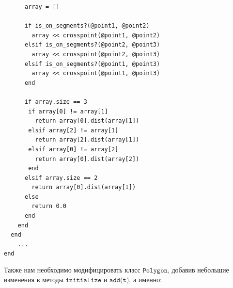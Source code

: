 \begin{small}
\begin{verbatim}
      array = []
	  
	  if is_on_segments?(@point1, @point2)
	    array << crosspoint(@point1, @point2) 
      elsif is_on_segments?(@point2, @point3)
	    array << crosspoint(@point2, @point3) 
      elsif is_on_segments?(@point1, @point3)
	    array << crosspoint(@point1, @point3) 
	  end
	  
      if array.size == 3 
       if array[0] != array[1]
	     return array[0].dist(array[1]) 
       elsif array[2] != array[1]
	     return array[2].dist(array[1]) 
       elsif array[0] != array[2]
	     return array[0].dist(array[2]) 
	   end
      elsif array.size == 2
        return array[0].dist(array[1])
      else
        return 0.0
      end
    end
  end
	...
end
\end{verbatim}
\end{small}

Также нам необходимо модифицировать класс $\texttt{Polygon}$, добавив небольшие изменения в методы 
$\texttt{initialize и add(t)}$, а именно:
 
